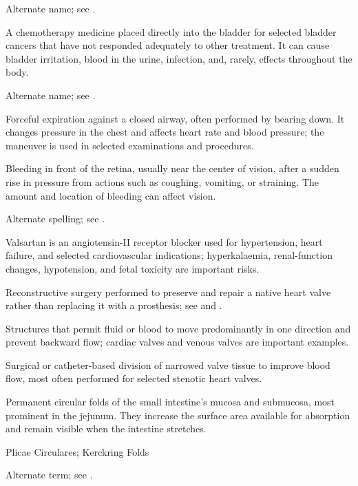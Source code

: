  Alternate name; see .

 A chemotherapy medicine placed directly into the bladder for selected bladder cancers that have not responded adequately to other treatment. It can cause bladder irritation, blood in the urine, infection, and, rarely, effects throughout the body.

 Alternate name; see .

 Forceful expiration against a closed airway, often performed by bearing down. It changes pressure in the chest and affects heart rate and blood pressure; the maneuver is used in selected examinations and procedures.

 Bleeding in front of the retina, usually near the center of vision, after a sudden rise in pressure from actions such as coughing, vomiting, or straining. The amount and location of bleeding can affect vision.

 Alternate spelling; see .

 Valsartan is an angiotensin-II receptor blocker used for hypertension, heart failure, and selected cardiovascular indications; hyperkalaemia, renal-function changes, hypotension, and fetal toxicity are important risks.

 Reconstructive surgery performed to preserve and repair a native heart valve rather than replacing it with a prosthesis; see  and .

 Structures that permit fluid or blood to move predominantly in one direction and prevent backward flow; cardiac valves and venous valves are important examples.

 Surgical or catheter-based division of narrowed valve tissue to improve blood flow, most often performed for selected stenotic heart valves.

 Permanent circular folds of the small intestine's mucosa and submucosa, most prominent in the jejunum. They increase the surface area available for absorption and remain visible when the intestine stretches.

\synonyms
Plicae Circulares; Kerckring Folds

 Alternate term; see .

